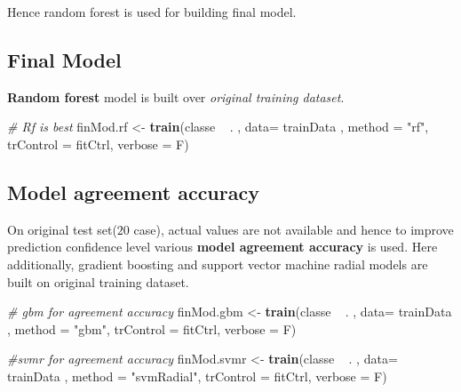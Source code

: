 \documentclass[]{article}
\newenvironment{Shaded}{\begin{snugshade}}{\end{snugshade}}
\newcommand{\KeywordTok}[1]{\textcolor[rgb]{0.13,0.29,0.53}{\textbf{{#1}}}}
\newcommand{\DataTypeTok}[1]{\textcolor[rgb]{0.13,0.29,0.53}{{#1}}}
\newcommand{\StringTok}[1]{\textcolor[rgb]{0.31,0.60,0.02}{{#1}}}
\newcommand{\CommentTok}[1]{\textcolor[rgb]{0.56,0.35,0.01}{\textit{{#1}}}}
\newcommand{\NormalTok}[1]{{#1}}
\begin{document}
Hence random forest is used for building final model.

\subsection{Final Model}\label{final-model}

\textbf{Random forest} model is built over \emph{original training
dataset}.

\begin{Shaded}
\begin{Highlighting}[]
\CommentTok{# Rf is best }
\NormalTok{finMod.rf <-}\StringTok{ }\KeywordTok{train}\NormalTok{(classe ~}\StringTok{ }\NormalTok{. , }\DataTypeTok{data=} \NormalTok{trainData , }\DataTypeTok{method =} \StringTok{"rf"}\NormalTok{, }
                \DataTypeTok{trControl =} \NormalTok{fitCtrl, }\DataTypeTok{verbose =} \NormalTok{F)}
\end{Highlighting}
\end{Shaded}

\subsection{Model agreement accuracy}\label{model-agreement-accuracy}

On original test set(\(20\) case), actual values are not available and
hence to improve prediction confidence level various \textbf{model
agreement accuracy} is used. Here additionally, gradient boosting and
support vector machine radial models are built on original training
dataset.

\begin{Shaded}
\begin{Highlighting}[]
\CommentTok{# gbm for agreement accuracy}
\NormalTok{finMod.gbm <-}\StringTok{ }\KeywordTok{train}\NormalTok{(classe ~}\StringTok{ }\NormalTok{. , }\DataTypeTok{data=} \NormalTok{trainData , }\DataTypeTok{method =} \StringTok{"gbm"}\NormalTok{, }
                   \DataTypeTok{trControl =} \NormalTok{fitCtrl, }\DataTypeTok{verbose =} \NormalTok{F)}

\CommentTok{#svmr for agreement accuracy}
\NormalTok{finMod.svmr <-}\StringTok{ }\KeywordTok{train}\NormalTok{(classe ~}\StringTok{ }\NormalTok{. , }\DataTypeTok{data=} \NormalTok{trainData , }\DataTypeTok{method =} \StringTok{"svmRadial"}\NormalTok{, }
                        \DataTypeTok{trControl =} \NormalTok{fitCtrl, }\DataTypeTok{verbose =} \NormalTok{F)}
\end{Highlighting}
\end{Shaded}
\end{document}
